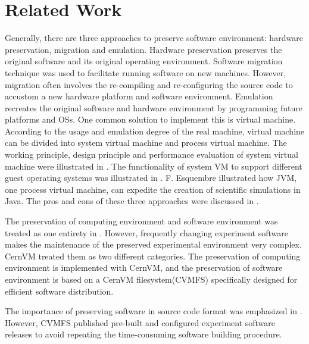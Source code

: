 \documentclass{sig-alternate}
\begin{document}
\section{Related Work }

Generally, there are three approaches to preserve software environment:
hardware preservation, migration and emulation.  Hardware
preservation preserves the original software and its original operating
environment. 
Software migration technique \cite{cifuentes1996binary,mancl2001refactoring} was used to facilitate running software on new machines.
However, migration often involves the re-compiling and re-configuring
the source code to accustom a new hardware platform and software environment.
Emulation recreates the original software and hardware environment by
programming future platforms and OSs. One common solution to implement this is
virtual machine. According to the usage and emulation degree of the real
machine, virtual machine can be divided into system virtual machine and process
virtual machine. 
The working principle, design principle and
performance evaluation of system virtual machine were illustrated in \cite{goldberg1974survey, smith2005architecture}. 
The
functionality of system VM to support different guest operating systems was illustrated in \cite{barham2003xen,kivity2007kvm,rosenblum1999vmware}.
F. Esquembre \cite{esquembre2004easy} illustrated how JVM, one process virtual machine, can expedite the creation of
scientific simulations in Java. 
The pros and cons of these three approaches were discussed in \cite{matthews2009towards,phelps2005no,hong2010software}.

The preservation of computing environment and software environment was treated as one entirety in \cite{matthews2009towards,phelps2005no,hong2010software}. However, frequently changing experiment software makes the maintenance of the preserved experimental environment very complex. 
CernVM \cite{buncic2010cernvm} treated them as two different categories. The preservation of computing environment is implemented with CernVM, and the preservation of software environment is based on a CernVM filesystem(CVMFS) specifically designed for efficient software distribution.

The importance of preserving software in source code format was emphasized in \cite{zabolitzky2002preserving,castagne2013consider}. 
However, CVMFS \cite{buncic2010cernvm} published pre-built and configured experiment software releases to avoid repeating the time-consuming software building procedure. 
\end{document}
